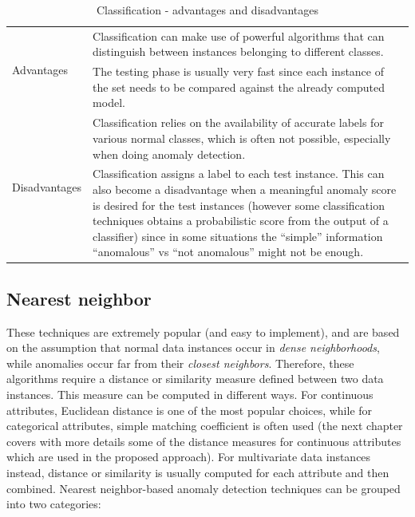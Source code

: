 \documentclass[12pt,a4paper,cucitura]{toptesi}
\begin{document}
\begin{table}
\centering
\begin{tabular}{l|p{12cm}}
\hline
\hline
\multirow{2}{*}{Advantages} & Classification can make use of powerful algorithms that can distinguish between instances belonging to different classes. \\
\cline{2-2}
 & The testing phase is usually very fast since each instance of the set needs to be compared against the already computed model. \\ 
\hline
\multirow{2}{*}{Disadvantages} & Classification relies on the availability of accurate labels for various normal classes, which is often not possible, especially when doing anomaly detection. \\
\cline{2-2}
& Classification assigns a label to each test instance. This can also become a disadvantage when a meaningful anomaly score is desired for
the test instances (however some classification techniques obtains a probabilistic score from the output of a classifier) since in some situations the ``simple'' information ``anomalous'' vs ``not anomalous'' might not be enough. \\
\hline
\hline
\end{tabular}
\caption{Classification - advantages and disadvantages}
\label{tab-classification}
\end{table}

\subsection{Nearest neighbor}

These techniques are extremely popular (and easy to implement), and are based on the assumption that normal data instances occur in \emph{dense neighborhoods}, while anomalies occur far from their \emph{closest neighbors}.
Therefore, these algorithms require a distance or similarity measure defined between two data instances. 
This measure can be computed in different ways. 
For continuous attributes, Euclidean distance is one of the most popular choices, while for categorical attributes, simple matching coefficient is often
used (the next chapter covers with more details some of the distance measures for continuous attributes which are used in the proposed approach).
For multivariate data instances instead, distance or similarity is usually computed for each attribute and then combined.
Nearest neighbor-based anomaly detection techniques can be grouped into two categories:
\end{document}
